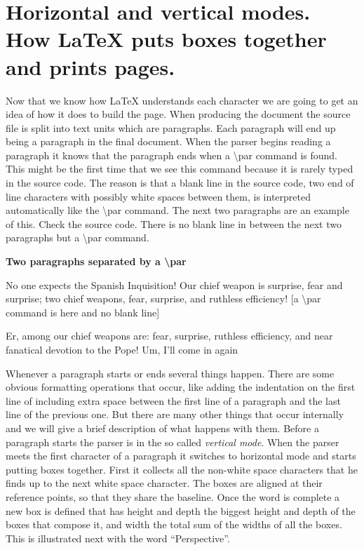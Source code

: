 \documentclass[a4paper]{article}
\newcommand{\bs}[1]{{\rmfamily\color{blue}\textbackslash{}#1}}
\newenvironment{example}[1]{%
\vspace{10pt}
\noindent\textbf{#1}\sffamily\par\vspace{10pt}%
}
{%
\par\vspace{10pt}
}
\begin{document}
\section{Horizontal and vertical modes. How \LaTeX{} puts boxes together and prints pages.}

Now that we know how \LaTeX{} understands each character we are going to get an idea of how it does to build the page. When producing the document the source file is split into text units which are paragraphs. Each paragraph will end up being a paragraph in the final document. When the parser begins reading a paragraph it knows that the paragraph ends when a \bs{par} command is found. This might be the first time that we see this command because it is rarely typed in the source code. The reason is that a blank line in the source code, two end of line characters with possibly white spaces between them, is interpreted automatically like the \bs{par} command. The next two paragraphs are an example of this. Check the source code. There is no blank line in between the next two paragraphs but a \bs{par} command.

\begin{example}{Two paragraphs separated by a \bs{par}}
No one expects the Spanish Inquisition! Our chief weapon is surprise, fear and surprise; two chief weapons, fear, surprise, and ruthless efficiency! [a \bs{par} command is here and no blank line]\par Er, among our chief weapons are: fear, surprise, ruthless efficiency, and near fanatical devotion to the Pope! Um, I'll come in again
\end{example}

Whenever a paragraph starts or ends several things happen. There are some obvious formatting operations that occur, like adding the indentation on the first line of including extra space between the first line of a paragraph and the last line of the previous one. But there are many other things that occur internally and we will give a brief description of what happens with them. Before a paragraph starts the parser is in the so called \emph{vertical mode}. When the parser meets the first character of a paragraph it switches to horizontal mode and starts putting boxes together. First it collects all the non-white space characters that he finds up to the next white space character. The boxes are aligned at their reference points, so that they share the baseline. Once the word is complete a new box is defined that has height and depth the biggest height and depth of the boxes that compose it, and width the total sum of the widths of all the boxes. This is illustrated next with the word ``Perspective''.\\
\end{document}
